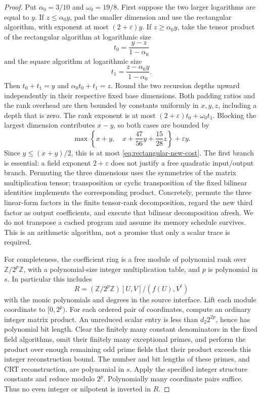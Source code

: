 \begin{proof}
Put $\alpha_0=3/10$ and $\omega_0=19/8$. First suppose the two larger
logarithms are equal to $y$. If $z\le\alpha_0y$, pad the smaller dimension
and use the rectangular algorithm, with exponent at most $(2+\varepsilon)y$.
If $z\ge\alpha_0y$, take the tensor product of the rectangular algorithm at
logarithmic size
\[
 t_0=\frac{y-z}{1-\alpha_0}
\]
and the square algorithm at logarithmic size
\[
 t_1=\frac{z-\alpha_0y}{1-\alpha_0}.
\]
Then $t_0+t_1=y$ and $\alpha_0t_0+t_1=z$. Round the two recursion
depths upward independently in their respective fixed base dimensions.
Both padding ratios and the rank overhead are then bounded by constants
uniformly in $x,y,z$, including a depth that is zero. The rank exponent is at most
$(2+\varepsilon)t_0+\omega_0t_1$. Blocking the largest dimension contributes
$x-y$, so both cases are bounded by
\[
 \max\left\{x+y,\quad
 x+\frac{47}{56}y+\frac{15}{28}z\right\}+\varepsilon y.
\]
Since $y\le(x+y)/2$, this is at most \eqref{eq:rectangular-new-cost}.
The first branch is essential: a field exponent $2+\varepsilon$ does not
justify a free quadratic input/output branch. Permuting the three dimensions
uses the symmetries of the matrix multiplication tensor; transposition or
cyclic transposition of the fixed bilinear identities implements the
corresponding product. Concretely, permute the three linear-form factors in
the finite tensor-rank decomposition, regard the new third factor as output
coefficients, and execute that bilinear decomposition afresh. We do not
transpose a cached program and assume its memory schedule survives. This is
an arithmetic algorithm, not a promise that only a scalar trace is required.

For completeness, the coefficient ring is a free module of polynomial rank
over $\mathbb Z/2^p\mathbb Z$, with a polynomial-size integer multiplication
table, and $p$ is polynomial in $s$. In particular this includes
\[
 R=(\mathbb Z/2^p\mathbb Z)[U,V]/(f(U),V^\ell)
\]
with the monic polynomials and degrees in the source interface. Lift each
module coordinate to $[0,2^p)$. For each ordered pair of coordinates, compute
an ordinary integer matrix product. An unreduced scalar entry is less than
$d_2 2^{2p}$, hence has polynomial bit length. Clear the finitely many
constant denominators in the fixed field algorithms, omit their finitely many
exceptional primes, and perform the product over enough remaining odd prime
fields that their product exceeds this integer reconstruction bound. The
number and bit lengths of these primes, and CRT reconstruction, are
polynomial in $s$. Apply the specified integer structure constants and reduce
modulo $2^p$. Polynomially many coordinate pairs suffice. Thus no even
integer or nilpotent is inverted in $R$.


\end{proof}
